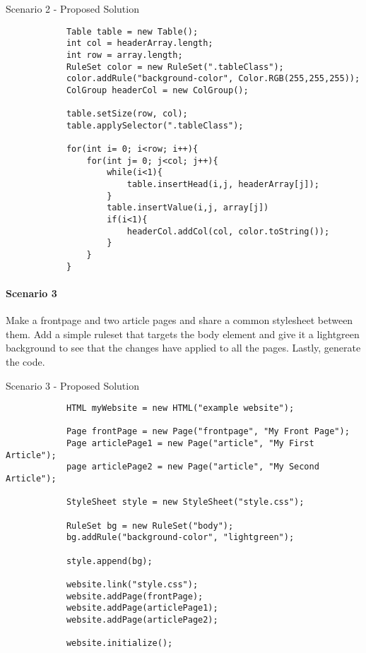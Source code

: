 \documentclass[12pt]{article}
\begin{document}
        \begin{shaded}
            Scenario 2 - Proposed Solution
            \begin{lstlisting}
            Table table = new Table();
            int col = headerArray.length;
            int row = array.length;
            RuleSet color = new RuleSet(".tableClass");
            color.addRule("background-color", Color.RGB(255,255,255));
            ColGroup headerCol = new ColGroup();

            table.setSize(row, col);
            table.applySelector(".tableClass");

            for(int i= 0; i<row; i++){
                for(int j= 0; j<col; j++){
                    while(i<1){
                        table.insertHead(i,j, headerArray[j]);
                    }
                    table.insertValue(i,j, array[j])
                    if(i<1){
                        headerCol.addCol(col, color.toString());
                    }
                }
            }
            \end{lstlisting}
        \end{shaded}

        \paragraph{Scenario 3}
        Make a frontpage and two article pages and share a common stylesheet between them. Add a simple ruleset that targets the body element and give it a lightgreen background to see that the changes have applied to all the pages. Lastly, generate the code.

        \begin{shaded}
            Scenario 3 - Proposed Solution
            \begin{lstlisting}
            HTML myWebsite = new HTML("example website");
            
            Page frontPage = new Page("frontpage", "My Front Page");
            Page articlePage1 = new Page("article", "My First Article");
            page articlePage2 = new Page("article", "My Second Article");

            StyleSheet style = new StyleSheet("style.css");

            RuleSet bg = new RuleSet("body");
            bg.addRule("background-color", "lightgreen");

            style.append(bg);

            website.link("style.css");
            website.addPage(frontPage);
            website.addPage(articlePage1);
            website.addPage(articlePage2);

            website.initialize();
            \end{lstlisting}
        \end{shaded}
\end{document}
